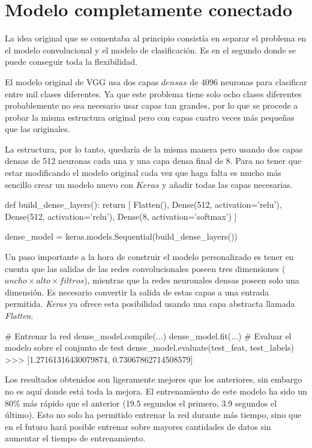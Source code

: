 \section{Modelo completamente conectado}

La idea original que se comentaba al principio consistía en separar el problema en el modelo convolucional y el modelo de clasificación. Es en el segundo donde se puede conseguir toda la flexibilidad.

El modelo original de VGG usa dos capas $densas$ de 4096 neuronas para clasificar entre mil clases diferentes. Ya que este problema tiene solo ocho clases diferentes probablemente no sea necesario usar capas tan grandes, por lo que se procede a probar la misma estructura original pero con capas cuatro veces más pequeñas que las originales.

La estructura, por lo tanto, quedaría de la misma manera pero usando dos capas densas de 512 neuronas cada una y una capa densa final de 8. Para no tener que estar modificando el modelo original cada vez que haga falta es mucho más sencillo crear un modelo nuevo con $Keras$ y añadir todas las capas necesarias.

\begin{python}
def build_dense_layers():
    return [
        Flatten(),
        Dense(512, activation='relu'),
        Dense(512, activation='relu'),
        Dense(8, activation='softmax')
    ]

dense_model = keras.models.Sequential(build_dense_layers())
\end{python}

Un paso importante a la hora de construir el modelo personalizado es tener en cuenta que las salidas de las redes convolucionales poseen tres dimensiones ($ancho \times alto \times filtros$), mientras que la redes neuronales densas poseen solo una dimensión. Es necesario convertir la salida de estas capas a una entrada permitida. \textit{Keras} ya ofrece esta posibilidad usando una capa abstracta llamada \textit{Flatten}.

\begin{python}
# Entrenar la red
dense_model.compile(...)
dense_model.fit(...)
# Evaluar el modelo sobre el conjunto de test
dense_model.evaluate(test_feat, test_labels)
>>> [1.27161316430079874, 0.73067862714508579]
\end{python}

Los resultados obtenidos son ligeramente mejores que los anteriores, sin embargo no es aquí donde está toda la mejora. El entrenamiento de este modelo ha sido un 80\% más rápido que el anterior (19.5 segundos el primero, 3.9 segundos el último). Esto no solo ha permitido entrenar la red durante más tiempo, sino que en el futuro hará posible entrenar sobre mayores cantidades de datos sin aumentar el tiempo de entrenamiento.

